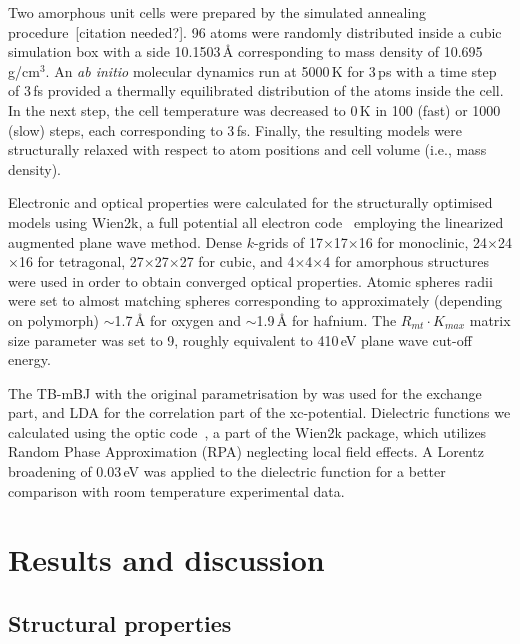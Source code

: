 \documentclass[10pt,a4paper,twocolumn]{article}
\begin{document}
Two amorphous unit cells were prepared by the simulated annealing procedure~[citation needed?].
96 atoms were randomly distributed inside a cubic simulation box with a side 10.1503\,\AA{} corresponding to mass density of 10.695\,g/cm$^3$.
An \textit{ab initio} molecular dynamics run at 5000\,K for 3\,ps with a time step of 3\,fs provided a thermally equilibrated distribution of the atoms inside the cell.
In the next step, the cell temperature was decreased to 0\,K in 100 (fast) or 1000 (slow) steps, each corresponding to 3\,fs.
Finally, the resulting models were structurally relaxed with respect to atom positions and cell volume (i.e., mass density).

Electronic and optical properties were calculated for the structurally optimised models using Wien2k, a full potential all electron code~\cite{Blaha2001} employing the linearized augmented plane wave method.
Dense $k$-grids of 17$\times$17$\times$16 for monoclinic, 24$\times$24$\times$16 for tetragonal, 27$\times$27$\times$27 for cubic, and 4$\times$4$\times$4 for amorphous structures were used in order to obtain converged optical properties.
Atomic spheres radii were set to almost matching spheres corresponding to approximately (depending on polymorph) $\sim$1.7\,\AA{} for oxygen and $\sim$1.9\,\AA{} for hafnium.
The $R_{mt} \cdot K_{max}$ matrix size parameter was set to 9, roughly equivalent to 410\,eV plane wave cut-off energy.

The TB-mBJ with the original parametrisation by \citet{Tran2009} was used for the exchange part, and LDA for the correlation part of the xc-potential. Dielectric functions we calculated using the optic code~\cite{AmbroschDraxl2006}, a part of the Wien2k package, which utilizes Random Phase Approximation (RPA) neglecting local field effects.
A Lorentz broadening of 0.03\,eV was applied to the dielectric function for a better comparison with room temperature experimental data.

\section{Results and discussion}

\subsection{Structural properties}
\end{document}
